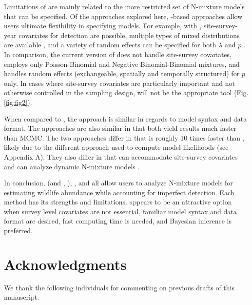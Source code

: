 \documentclass[article]{jss}
\begin{document}
Limitations of  are mainly related to the more restricted set of N-mixture models that can be specified. Of the approaches explored here, -based approaches allow users ultimate flexibility in specifying models. For example, with , site-survey-year covariates for detection are possible, multiple types of mixed distributions are available \citep{Joseph_Elkin_Martin_Possingham_2009,Martin_Royle_Mackenzie_Edwards_Kery_Gardner_2011}, and a variety of random effects can be specified for both $\lambda$ and $p$ \citep{Kery_Schaub_2011}. In comparison, the current version of  does not handle site-survey covariates, employs only Poisson-Binomial and Negative Binomial-Binomial mixtures, and handles random effects (exchangeable, spatially and temporally structured) for $p$ only. In cases where site-survey covariates are particularly important and not otherwise controlled in the sampling design,  will not be the appropriate tool (Fig. \ref{fig:fig2}).

When compared to , the  approach is similar in regards to model syntax and data format. The approaches are also similar in that both yield results much faster than MCMC. The two approaches differ in that  is roughly 10 times faster than , likely due to the different approach used to compute model likelihoods (see Appendix A). They also differ in that  can accommodate site-survey covariates and can analyze dynamic N-mixture models \citep{Chandler_Royle_King_2011, Dail_Madsen_2011}.

In conclusion,  (and , ), , and  all allow users to analyze N-mixture models for estimating wildlife abundance while accounting for imperfect detection. Each method has its strengths and limitations.  appears to be an attractive option when survey level covariates are not essential, familiar model syntax and data format are desired, fast computing time is needed, and Bayesian inference is preferred.

\section*{Acknowledgments}
We thank the following individuals for commenting on previous drafts of this manuscript.


\end{document}
